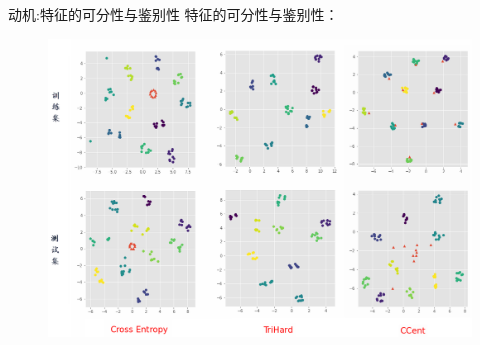 \documentclass[usenames,dvipsnames,notes]{beamer}
\begin{document}
\begin{frame}{动机:特征的可分性与鉴别性}
	特征的可分性与鉴别性：
	\begin{figure}
		\centering
		\includegraphics[width=.9\textwidth]{fig/final1.png}
	\end{figure}
\end{frame}
\end{document}
